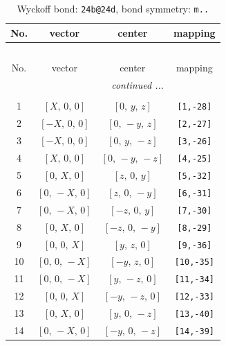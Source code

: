 \documentclass[fleqn,8pt]{jsarticle}
\begin{document}
\begin{longtable}{cccc}
\caption{Wyckoff bond: {\tt 24b@24d}, bond symmetry: {\tt m..}}
 \\
 \hline \hline
No. & vector & center & mapping \\ \hline \endfirsthead

\multicolumn{3}{l}{\tablename\ \thetable{}} \\
 \hline \hline
No. & vector & center & mapping \\ \hline \endhead

 \hline \hline
\multicolumn{3}{r}{\footnotesize\it continued ...} \\ \endfoot

 \hline \hline
\multicolumn{3}{r}{} \\ \endlastfoot

1 & $\left[ X,\, 0,\, 0 \right]$ & $\left[ 0,\, y,\, z \right]$ & {\tt [1,-28]} \\ \hline
2 & $\left[ - X,\, 0,\, 0 \right]$ & $\left[ 0,\, - y,\, z \right]$ & {\tt [2,-27]} \\ \hline
3 & $\left[ - X,\, 0,\, 0 \right]$ & $\left[ 0,\, y,\, - z \right]$ & {\tt [3,-26]} \\ \hline
4 & $\left[ X,\, 0,\, 0 \right]$ & $\left[ 0,\, - y,\, - z \right]$ & {\tt [4,-25]} \\ \hline
5 & $\left[ 0,\, X,\, 0 \right]$ & $\left[ z,\, 0,\, y \right]$ & {\tt [5,-32]} \\ \hline
6 & $\left[ 0,\, - X,\, 0 \right]$ & $\left[ z,\, 0,\, - y \right]$ & {\tt [6,-31]} \\ \hline
7 & $\left[ 0,\, - X,\, 0 \right]$ & $\left[ - z,\, 0,\, y \right]$ & {\tt [7,-30]} \\ \hline
8 & $\left[ 0,\, X,\, 0 \right]$ & $\left[ - z,\, 0,\, - y \right]$ & {\tt [8,-29]} \\ \hline
9 & $\left[ 0,\, 0,\, X \right]$ & $\left[ y,\, z,\, 0 \right]$ & {\tt [9,-36]} \\ \hline
10 & $\left[ 0,\, 0,\, - X \right]$ & $\left[ - y,\, z,\, 0 \right]$ & {\tt [10,-35]} \\ \hline
11 & $\left[ 0,\, 0,\, - X \right]$ & $\left[ y,\, - z,\, 0 \right]$ & {\tt [11,-34]} \\ \hline
12 & $\left[ 0,\, 0,\, X \right]$ & $\left[ - y,\, - z,\, 0 \right]$ & {\tt [12,-33]} \\ \hline
13 & $\left[ 0,\, X,\, 0 \right]$ & $\left[ y,\, 0,\, - z \right]$ & {\tt [13,-40]} \\ \hline
14 & $\left[ 0,\, - X,\, 0 \right]$ & $\left[ - y,\, 0,\, - z \right]$ & {\tt [14,-39]} \\ \hline

\end{longtable}
\end{document}
